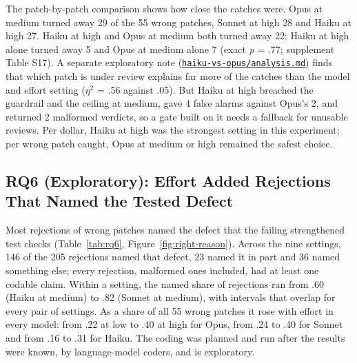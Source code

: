 \documentclass[sigconf,nonacm]{acmart}
\newcommand{\code}[1]{\texttt{#1}}
\begin{document}
The patch-by-patch comparison shows how close the catches were. Opus at medium turned away 29 of the 55 wrong patches, Sonnet at high 28 and Haiku at high 27. Haiku at high and Opus at medium both turned away 22; Haiku at high alone turned away 5 and Opus at medium alone 7 (exact \textit{p} = .77; supplement Table S17). A separate exploratory note (\href{https://github.com/trustmybot/research-artifacts/blob/cr-effort-claude-5.5-v1.2/papers/cr-effort-claude-5.5/haiku-vs-opus/analysis.md}{\code{haiku-vs-opus/analysis.md}}) finds that which patch is under review explains far more of the catches than the model and effort setting ($\eta^2$ = .56 against .05). But Haiku at high breached the guardrail and the ceiling at medium, gave 4 false alarms against Opus's 2, and returned 2 malformed verdicts, so a gate built on it needs a fallback for unusable reviews. Per dollar, Haiku at high was the strongest setting in this experiment; per wrong patch caught, Opus at medium or high remained the safest choice.

\subsection{RQ6 (Exploratory): Effort Added Rejections That Named the Tested Defect}\label{sec:rq6}

Most rejections of wrong patches named the defect that the failing strengthened test checks (Table~\ref{tab:rq6}, Figure~\ref{fig:right-reason}). Across the nine settings, 146 of the 205 rejections named that defect, 23 named it in part and 36 named something else; every rejection, malformed ones included, had at least one codable claim. Within a setting, the named share of rejections ran from .60 (Haiku at medium) to .82 (Sonnet at medium), with intervals that overlap for every pair of settings. As a share of all 55 wrong patches it rose with effort in every model: from .22 at low to .40 at high for Opus, from .24 to .40 for Sonnet and from .16 to .31 for Haiku. The coding was planned and run after the results were known, by language-model coders, and is exploratory.
\end{document}
